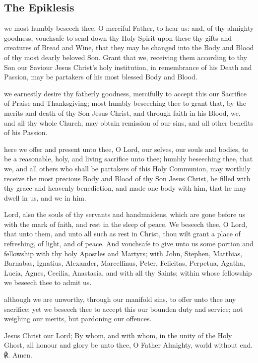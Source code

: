 \subsection{The Epiklesis}
 we most humbly beseech thee, O merciful Father, to hear us: and, of thy almighty goodness, vouchsafe to send down thy Holy Spirit upon these thy gifts and creatures of Bread and Wine, that they may be changed into the Body and Blood of thy most dearly beloved Son. Grant that we, receiving them according to thy Son our Saviour Jesus Christ's holy institution, in remembrance of his Death and Passion, may be partakers of his most blessed Body and Blood.
\par
{} we earnestly desire thy fatherly goodness, mercifully to accept this our Sacrifice of Praise and Thanksgiving; most humbly beseeching thee to grant that, by the merits and death of thy Son Jesus Christ, and through faith in his Blood, we, and all thy whole Church, may obtain remission of our sins, and all other benefits of his Passion.
\par
{} here we offer and present unto thee, O Lord, our selves, our souls and bodies, to be a reasonable, holy, and living sacrifice unto thee; humbly beseeching thee, that we, and all others who shall be partakers of this Holy Communion, may worthily receive the most precious Body and Blood of thy Son Jesus Christ, be filled with thy grace and heavenly benediction, and made one body with him, that he may dwell in us, and we in him. 
\par
{} Lord, also the souls of thy servants and handmaidens, which are gone before us with the mark of faith, and rest in the sleep of peace.  We beseech thee, O Lord, that unto them, and unto all such as rest in Christ, thou wilt grant a place of refreshing, of light, and of peace. And vouchsafe to give unto us some portion and fellowship with thy holy Apostles and Martyrs; with John, Stephen, Matthias, Barnabas, Ignatius, Alexander, Marcellinus, Peter, Felicitas, Perpetua, Agatha, Lucia, Agnes, Cecilia, Anastasia, and with all thy Saints; within whose fellowship we beseech thee to admit us.
\par
{} although we are unworthy, through our manifold sins, to offer unto thee any sacrifice; yet we beseech thee to accept this our bounden duty and service; not weighing our merits, but pardoning our offences.
\par
{} Jesus Christ our Lord; By whom, and with whom, in the unity of the Holy Ghost, all honour and glory be unto thee, O Father Almighty, world without end. ℟. Amen.
